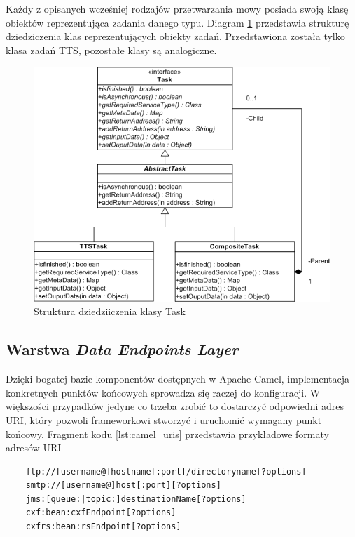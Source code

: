 Każdy z opisanych wcześniej rodzajów przetwarzania mowy posiada swoją klasę obiektów reprezentująca zadania danego typu. Diagram \ref {fig:task_class_hierarchy} przedstawia strukturę dziedziczenia klas reprezentujących obiekty zadań. Przedstawiona została tylko klasa zadań TTS, pozostałe klasy są analogiczne. 

\begin{figure}[!h]
	\centering
	\includegraphics[scale=0.65]{tasks_hierarhy.png}
	\caption{Struktura dziedziiczenia klasy Task}\label{fig:task_class_hierarchy}
\end{figure}


\subsection{Warstwa \textit{Data Endpoints Layer}}

Dzięki bogatej bazie komponentów dostępnych w Apache Camel, implementacja konkretnych punktów końcowych sprowadza się raczej do konfiguracji. W większości przypadków jedyne co trzeba zrobić to dostarczyć odpowiedni adres URI, który pozwoli frameworkowi stworzyć i uruchomić wymagany punkt końcowy. Fragment kodu \ref{lst:camel_uris} przedstawia przykładowe formaty adresów URI

\lstset{language=Java, tabsize=4, caption=Przykładowe formaty adresów URI dla punktów końcowych Apache Camel.,label=lst:camel_uris}
\begin{minipage}{\linewidth}
\begin{center}
\begin{lstlisting}
	ftp://[username@]hostname[:port]/directoryname[?options]
	smtp://[username@]host[:port][?options]
	jms:[queue:|topic:]destinationName[?options]
	cxf:bean:cxfEndpoint[?options]
	cxfrs:bean:rsEndpoint[?options]
\end{lstlisting}
\end{center}
\end{minipage}


